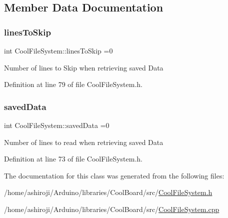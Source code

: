 \subsection{Member Data Documentation}
\mbox{\label{class_cool_file_system_a84fdb6057e534b395512463daa28ea3c}} 
\subsubsection{\texorpdfstring{lines\+To\+Skip}{linesToSkip}}
{\footnotesize\ttfamily int Cool\+File\+System\+::lines\+To\+Skip =0\hspace{0.3cm}{\ttfamily [private]}}

Number of lines to Skip when retrieving saved Data 

Definition at line 79 of file Cool\+File\+System.\+h.

\mbox{\label{class_cool_file_system_ad9f5b739a32100f5f21270c3d9ee2b1d}} 
\subsubsection{\texorpdfstring{saved\+Data}{savedData}}
{\footnotesize\ttfamily int Cool\+File\+System\+::saved\+Data =0\hspace{0.3cm}{\ttfamily [private]}}

Number of lines to read when retrieving saved Data 

Definition at line 73 of file Cool\+File\+System.\+h.



The documentation for this class was generated from the following files\+:\begin{DoxyCompactItemize}
\item 
/home/ashiroji/\+Arduino/libraries/\+Cool\+Board/src/\hyperlink{_cool_file_system_8h}{Cool\+File\+System.\+h}\item 
/home/ashiroji/\+Arduino/libraries/\+Cool\+Board/src/\hyperlink{_cool_file_system_8cpp}{Cool\+File\+System.\+cpp}\end{DoxyCompactItemize}
